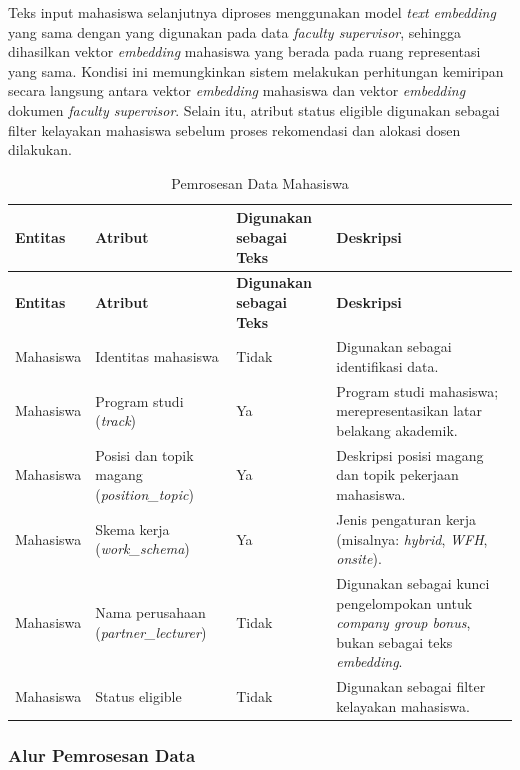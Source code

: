 Teks input mahasiswa selanjutnya diproses menggunakan model \textit{text embedding} yang sama dengan yang digunakan pada data \textit{faculty supervisor}, sehingga dihasilkan vektor \textit{embedding} mahasiswa yang berada pada ruang representasi yang sama. Kondisi ini memungkinkan sistem melakukan perhitungan kemiripan secara langsung antara vektor \textit{embedding} mahasiswa dan vektor \textit{embedding} dokumen \textit{faculty supervisor}. Selain itu, atribut status eligible digunakan sebagai filter kelayakan mahasiswa sebelum proses rekomendasi dan alokasi dosen dilakukan.

\begin{longtable}[c]{|p{2cm}|p{3cm}|p{2.5cm}|p{5.5cm}|}

\caption{Pemrosesan Data Mahasiswa} \label{table:pemrosesan_data_mahasiswa} \\
\hline
\textbf{Entitas} & \textbf{Atribut} & \textbf{Digunakan sebagai Teks} & \textbf{Deskripsi} \\ \hline
\endfirsthead

\hline
\textbf{Entitas} & \textbf{Atribut} & \textbf{Digunakan sebagai Teks} & \textbf{Deskripsi} \\ \hline
\endhead

\hline
\endlastfoot

Mahasiswa & Identitas mahasiswa & Tidak & Digunakan sebagai identifikasi data. \\ \hline
Mahasiswa & Program studi (\textit{track}) & Ya & Program studi mahasiswa; merepresentasikan latar belakang akademik. \\ \hline
Mahasiswa & Posisi dan topik magang (\textit{position\_topic}) & Ya & Deskripsi posisi magang dan topik pekerjaan mahasiswa. \\ \hline
Mahasiswa & Skema kerja (\textit{work\_schema}) & Ya & Jenis pengaturan kerja (misalnya: \textit{hybrid}, \textit{WFH}, \textit{onsite}). \\ \hline
Mahasiswa & Nama perusahaan (\textit{partner\_lecturer}) & Tidak & Digunakan sebagai kunci pengelompokan untuk \textit{company group bonus}, bukan sebagai teks \textit{embedding}. \\ \hline
Mahasiswa & Status eligible & Tidak & Digunakan sebagai filter kelayakan mahasiswa. \\ \hline

\end{longtable}

\subsubsection{Alur Pemrosesan Data}\label{alur-pemrosesan-data}

